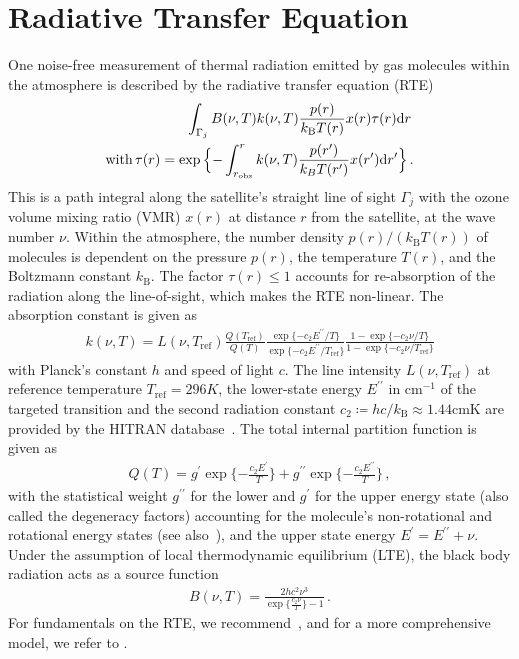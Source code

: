 \section{Radiative Transfer Equation}
\label{sec:RTE}
One noise-free measurement of thermal radiation emitted by gas molecules within the atmosphere is described by the radiative transfer equation (RTE)~\cite{mipas2000handbook}
\begin{align}
	\label{eq:RTE} 
	  \int_{\Gamma_j}  B(\nu,T) k(\nu, T)   \frac{p(r)}{k_{\text{B}} T(r)}  x(r)  \tau(r) \text{d}r \,  \\
\text{with} \,	\tau(r) = \exp{ \Bigl\{ - \int^{r}_{r_\text{obs}}  k(\nu, T)   \frac{p(r^{\prime})}{k_B T(r^{\prime})}  x(r^{\prime}) \text{d}r^{\prime} \Bigr\} } \, \label{eq:absRTE} .
\end{align}
This is a path integral along the satellite's straight line of sight $\Gamma_j$ with the ozone volume mixing ratio (VMR) $x(r)$ at distance $r$ from the satellite, at the wave number $\nu$.
Within the atmosphere, the number density $p(r) / (k_{\text{B}} T(r))$ of molecules is dependent on the pressure $p(r)$, the temperature $T(r)$, and the Boltzmann constant $k_{\text{B}}$.
The factor $\tau(r)\leq 1$ accounts for re-absorption of the radiation along the line-of-sight, which makes the RTE non-linear.
The absorption constant is given as
\begin{align}
	k(\nu, T) = L(\nu, T_{\text{ref}}) \frac{Q(T_{\text{ref}})}{Q(T)} \frac{ \exp{\{ - c_2 E^{\prime \prime} / T\}} }{\exp{\{ - c_2 E^{\prime \prime} / T_{\text{ref}} \}}} \frac{ 1- \exp{\{ - c_2 \nu  / T \}} }{1 - \exp{\{ - c_2 \nu / T_{\text{ref}} \}}}
\end{align}
with Planck's constant $h$ and speed of light $c$.
The line intensity $L(\nu, T_{\text{ref}})$ at reference temperature $T_{\text{ref}} =296K $, the lower-state energy $ E^{\prime \prime} $ in $\text{cm}^{-1}$ of the targeted transition and the second radiation constant $c_2\coloneqq hc/k_{\text{B}} \approx 1.44\text{cmK}$ are provided by the HITRAN database~\cite{gordon2022hitran2020}.
The total internal partition function is given as
\begin{align}
	Q(T )= g^{ \prime} \exp{\{ - \frac{ c_2 E^{ \prime} }{T}\}} + g^{\prime \prime} \exp{\{ - \frac{ c_2 E^{\prime \prime} }{T}\}} \, ,
\end{align}
with the statistical weight $ g^{\prime \prime}$ for the lower and $ g^{ \prime}$ for the upper energy state (also called the degeneracy factors) accounting for the molecule's non-rotational and rotational energy states (see also~\cite{vsimevckova2006einstein}), and the upper state energy $E^{ \prime} = E^{ \prime\prime} + \nu$.
Under the assumption of local thermodynamic equilibrium (LTE), the black body radiation acts as a source function
\begin{align}
	B(\nu,T)   = \frac{2 h c^2 \nu^3}{\exp{\{\frac{c_2\nu}{ T}\}}-1}\, .
\end{align}
For fundamentals on the RTE, we recommend~\cite[Chapter 1]{rybicki2000rte}, and for a more comprehensive model, we refer to \cite{read2006forwardModel}.

